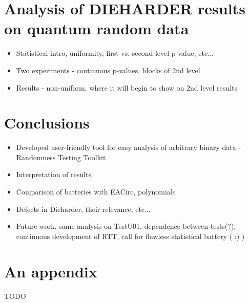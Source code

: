 \documentclass[
  digital,  	%
  color,		%
  oneside,   	%
  12pt,
  nocover,
  notable,
  nolof,
  nolot,
]{fithesis3}
\begin{document}
\chapter{Analysis of DIEHARDER results on quantum random data}
\begin{itemize}
\item Statistical intro, uniformity, first vs. second level p-value, etc...
\item Two experiments - continuous p-values, blocks of 2nd level
\item Results - non-uniform, where it will begin to show on 2nd level results
\end{itemize}

\chapter{Conclusions}
\begin{itemize}
\item Developed user-friendly tool for easy analysis of arbitrary binary data - Randomness Testing Toolkit
\item Interpretation of results
\item Comparison of batteries with EACirc, polynomials
\item Defects in Dieharder, their relevance, etc...
\item Future work, same analysis on TestU01, dependence between tests(?), continuous development of RTT, call for flawless statistical battery ( :) )
\end{itemize}

\appendix

\printbibliography

\chapter{An appendix}
\begin{huge}
TODO
\end{huge}
\end{document}
